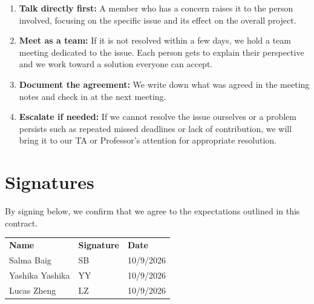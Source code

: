 \documentclass[12pt]{article}
\begin{document}
\begin{enumerate}
  \item \textbf{Talk directly first:} A member who has a concern raises it to the person involved, focusing on the specific issue and its effect on the overall project.
  \item \textbf{Meet as a team:} If it is not resolved within a few days, we hold a team meeting dedicated to the issue. Each person gets to explain their perspective and we work toward a solution everyone can accept.
  \item \textbf{Document the agreement:} We write down what was agreed in the meeting notes and check in at the next meeting.
  
  \item \textbf{Escalate if needed:} If we cannot resolve the issue ourselves or a problem persists such as repeated missed deadlines or lack of contribution,  we will bring it to our TA or Professor's attention for appropriate resolution.
\end{enumerate}


\section{Signatures}

By signing below, we confirm that we agree to the expectations outlined in this contract.

\vspace{1em}

\renewcommand{\arraystretch}{2.6}
\begin{tabular}{@{}p{5cm} p{6cm} p{3.5cm}@{}}
  \textbf{Name} & \textbf{Signature} & \textbf{Date} \\
  Salma Baig      & SB & 10/9/2026 \\
  Yashika Yashika & YY & 10/9/2026 \\
  Lucas Zheng     & LZ & 10/9/2026 \\
\end{tabular}
\end{document}
